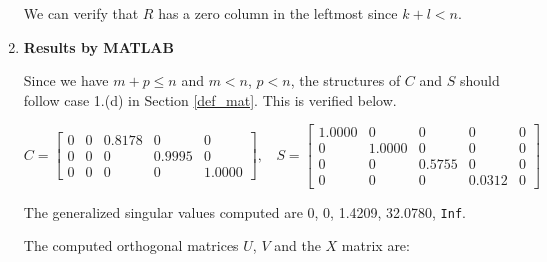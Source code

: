\begin{enumerate}[(1).]
            We can verify that $R$ has a zero column in the leftmost since $k+l < n$. 
            
        \item \textbf{Results by MATLAB}
        
            Since we have $m + p  \leq n$ and $m < n$, $p < n$, the structures of $C$ and $S$ should follow case 1.(d) in Section \ref{def_mat}. This is verified below.
            
            \begin{equation*}
                C = \begin{bmatrix}
                    0 & 0 & 0.8178 & 0 & 0 \\
                    0 & 0 & 0 & 0.9995 & 0 \\
                    0 & 0 & 0 & 0 & 1.0000
                \end{bmatrix}, \ \ \ \
                S = \begin{bmatrix}
                    1.0000 & 0 & 0 & 0 & 0 \\
                    0 & 1.0000 & 0 & 0 & 0 \\
                    0 & 0 & 0.5755 & 0 & 0 \\
                    0 & 0 & 0 & 0.0312 & 0
                \end{bmatrix}
            \end{equation*}
            
            The generalized singular values computed are 0, 0, 1.4209, 32.0780, \texttt{Inf}.
            
            The computed orthogonal matrices $U$, $V$ and the $X$ matrix are:
            

\end{enumerate}
